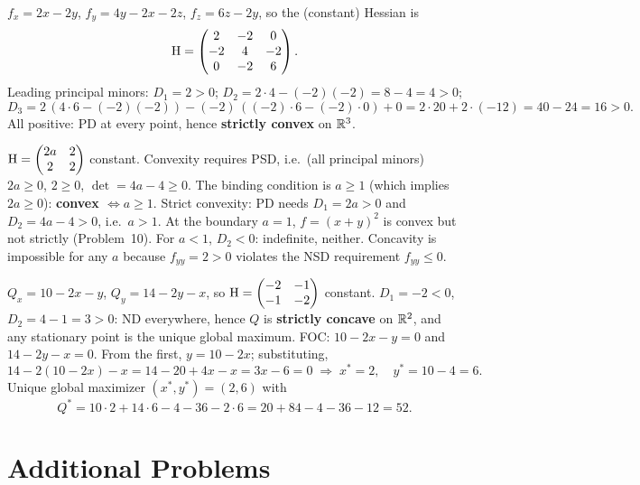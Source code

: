\begin{solutions}
  \item $f_x=2x-2y$, $f_y=4y-2x-2z$, $f_z=6z-2y$, so the (constant)
        Hessian is
        \[
          \operatorname{H}=\begin{pmatrix}2&-2&0\\-2&4&-2\\0&-2&6\end{pmatrix}.
        \]
        Leading principal minors: $D_1=2>0$;
        $D_2=2\cdot4-(-2)(-2)=8-4=4>0$;
        \[
          D_3=2\,(4\cdot6-(-2)(-2))-(-2)\,((-2)\cdot6-(-2)\cdot0)+0
             =2\cdot20+2\cdot(-12)=40-24=16>0 .
        \]
        All positive: PD at every point, hence \textbf{strictly convex}
        on $\mathbb{R}^{3}$.

  \item $\operatorname{H}=\begin{pmatrix}2a&2\\2&2\end{pmatrix}$ constant. Convexity
        requires PSD, i.e.\ (all principal minors) $2a\ge0$, $2\ge0$,
        $\det=4a-4\ge0$. The binding condition is $a\ge1$ (which implies
        $2a\ge0$): \textbf{convex $\iff a\ge1$}. Strict convexity: PD
        needs $D_1=2a>0$ and $D_2=4a-4>0$, i.e.\ \textbf{$a>1$}. At the
        boundary $a=1$, $f=(x+y)^{2}$ is convex but not strictly
        (Problem~10). For $a<1$, $D_2<0$: indefinite, neither. Concavity
        is impossible for any $a$ because $f_{yy}=2>0$ violates the NSD
        requirement $f_{yy}\le0$.

  \item $Q_x=10-2x-y$, $Q_y=14-2y-x$, so
        $\operatorname{H}=\begin{pmatrix}-2&-1\\-1&-2\end{pmatrix}$ constant.
        $D_1=-2<0$, $D_2=4-1=3>0$: ND everywhere, hence $Q$ is
        \textbf{strictly concave} on $\mathbb{R}^{2}$, and any stationary point
        is the unique global maximum. FOC: $10-2x-y=0$ and $14-2y-x=0$.
        From the first, $y=10-2x$; substituting,
        \[
          14-2(10-2x)-x = 14-20+4x-x = 3x-6 = 0
          \;\Rightarrow\; x^{*}=2,\quad y^{*}=10-4=6 .
        \]
        Unique global maximizer $(x^{*},y^{*})=(2,6)$ with
        \[
          Q^{*}=10\cdot2+14\cdot6-4-36-2\cdot6 = 20+84-4-36-12 = 52 .
        \]
\end{solutions}

\section{Additional Problems}

